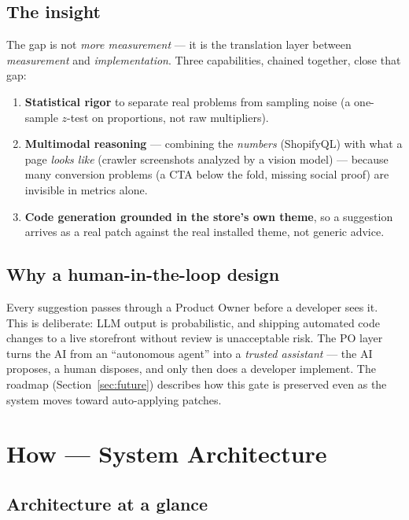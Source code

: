 \documentclass[11pt,a4paper]{article}
\begin{document}
\subsection{The insight}

The gap is not \emph{more measurement} --- it is the translation layer between
\emph{measurement} and \emph{implementation}. Three capabilities, chained
together, close that gap:

\begin{enumerate}[leftmargin=1.4em]
  \item \textbf{Statistical rigor} to separate real problems from sampling
  noise (a one-sample $z$-test on proportions, not raw multipliers).
  \item \textbf{Multimodal reasoning} --- combining the \emph{numbers}
  (ShopifyQL) with what a page \emph{looks like} (crawler screenshots analyzed
  by a vision model) --- because many conversion problems (a CTA below the
  fold, missing social proof) are invisible in metrics alone.
  \item \textbf{Code generation grounded in the store's own theme}, so a
  suggestion arrives as a real patch against the real installed theme, not
  generic advice.
\end{enumerate}

\subsection{Why a human-in-the-loop design}

Every suggestion passes through a Product Owner before a developer sees it.
This is deliberate: LLM output is probabilistic, and shipping automated code
changes to a live storefront without review is unacceptable risk. The PO layer
turns the AI from an ``autonomous agent'' into a \emph{trusted assistant} ---
the AI proposes, a human disposes, and only then does a developer implement.
The roadmap (Section~\ref{sec:future}) describes how this gate is preserved
even as the system moves toward auto-applying patches.

\section{How --- System Architecture}

\subsection{Architecture at a glance}
\end{document}

